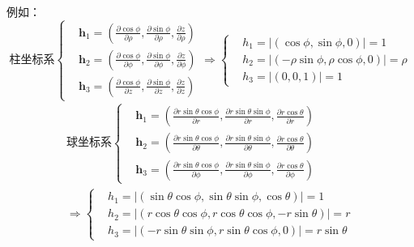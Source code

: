     例如：
    \begin{equation}
        \mbox{柱坐标系}\left\{\begin{aligned}
            &\bm{h}_1=\left(\frac{\partial \cos\phi}{\partial \rho},\frac{\partial \sin\phi}{\partial \rho},\frac{\partial z}{\partial \rho}\right)\\
            &\bm{h}_2=\left(\frac{\partial \cos\phi}{\partial \phi},\frac{\partial \sin\phi}{\partial \phi},\frac{\partial z}{\partial \phi}\right)\\
            &\bm{h}_3=\left(\frac{\partial \cos\phi}{\partial z},\frac{\partial \sin\phi}{\partial z},\frac{\partial z}{\partial z}\right)
        \end{aligned}\right.
        \Rightarrow
        \left\{\begin{aligned}
            &h_1=|\left(\cos\phi,\sin\phi,0\right)|=1\\
            &h_2=|\left(-\rho\sin\phi,\rho\cos\phi,0\right)|=\rho\\
            &h_3=|\left(0,0,1\right)|=1
        \end{aligned}\right.
    \end{equation}
    \begin{equation}
        \begin{aligned}
            \mbox{球坐标系}\left\{\begin{aligned}
                &\bm{h}_1=\left(\frac{\partial r\sin\theta\cos\phi}{\partial r},\frac{\partial r\sin\theta\sin\phi}{\partial r},\frac{\partial r\cos\theta}{\partial r}\right)\\
                &\bm{h}_2=\left(\frac{\partial r\sin\theta\cos\phi}{\partial \theta},\frac{\partial r\sin\theta\sin\phi}{\partial \theta},\frac{\partial r\cos\theta}{\partial \theta}\right)\\
                &\bm{h}_3=\left(\frac{\partial r\sin\theta\cos\phi}{\partial \phi},\frac{\partial r\sin\theta\sin\phi}{\partial \phi},\frac{\partial r\cos\theta}{\partial \phi}\right)
            \end{aligned}\right.\\
            \Rightarrow
            \left\{\begin{aligned}
                &h_1=|\left(\sin\theta\cos\phi,\sin\theta\sin\phi,\cos\theta\right)|=1\\
                &h_2=|\left(r\cos\theta\cos\phi,r\cos\theta\cos\phi,-r\sin\theta\right)|=r\\
                &h_3=|\left(-r\sin\theta\sin\phi,r\sin\theta\cos\phi,0\right)|=r\sin\theta
            \end{aligned}\right.
        \end{aligned}
    \end{equation}
